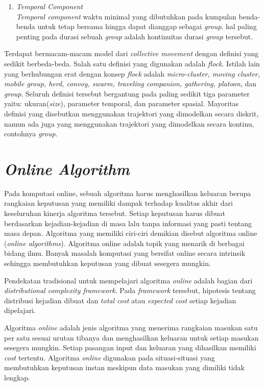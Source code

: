 \begin{enumerate}
\item \textit{Temporal Component}\\
\textit{Temporal component}  waktu minimal yang dibutuhkan pada kumpulan benda-benda untuk tetap bersama hingga dapat dianggap sebagai \textit{group}. hal paling penting pada durasi sebuah \textit{group} adalah kontinuitas durasi \textit{group} tersebut. 

\end{enumerate}
\par Terdapat bermacam-macam model dari \textit{collective movement} dengan definisi yang sedikit berbeda-beda. Salah satu definisi yang digunakan adalah \textit{flock}. Istilah lain yang berhubungan erat dengan konsep \textit{flock} adalah \textit{micro-cluster, moving cluster, mobile group, herd, convoy, swarm, traveling companion, gathering, platoon}, dan \textit{group}. Seluruh definisi tersebut bergantung pada paling sedikit tiga parameter yaitu: ukuran(\textit{size}), parameter temporal, dan parameter spasial. Mayoritas definisi yang disebutkan menggunakan trajektori yang dimodelkan secara diskrit, namun ada juga yang menggunakan trajektori yang dimodelkan secara kontinu, contohnya \textit{group}.
 
 
\section{\textit{Online Algorithm}}
Pada komputasi online, sebuah algoritma harus menghasilkan keluaran berupa rangkaian keputusan yang memiliki dampak terhadap kualitas akhir dari keseluruhan kinerja algoritma tersebut. Setiap keputusan harus dibuat berdasarkan kejadian-kejadian di masa lalu tanpa informasi yang pasti tentang masa depan. Algoritma yang memiliki ciri-ciri demikian disebut algoritma online (\textit{online algorithms}). Algoritma online adalah topik yang menarik di berbagai bidang ilmu. Banyak masalah komputasi yang bersifat online secara intrinsik sehingga membutuhkan keputusan yang dibuat sesegera mungkin. 
\par Pendekatan tradisional untuk mempelajari algoritma \textit{online} adalah bagian dari \textit{distributional complexity framework}.
 Pada \textit{framework} tersebut, hipotesis tentang distribusi kejadian dibuat dan \textit{total cost} atau \textit{expected cost} setiap kejadian dipelajari. \cite{algo_online_1_8_mar_2021:98}

\par Algoritma \textit{online} adalah jenis algoritma yang menerima rangkaian masukan satu per satu sesuai urutan tibanya dan menghasilkan keluaran untuk setiap masukan sesegera mungkin. Setiap pasangan input dan keluaran yang dihasilkan memiliki \textit{cost} tertentu. Algoritma \textit{online} digunakan pada situasi-situasi yang membutuhkan keputusan instan meskipun data masukan yang dimiliki tidak lengkap.  

